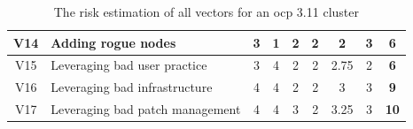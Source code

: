 \begin{landscape}
\begin{table}[]
{\begin{tabular}{|c|l|cccc|cc|c|}
V14             & Adding rogue nodes                                                                     & 3                                        & 1                              & 2                                        & 2                    & 2                                      & 3            & \textbf{6}           \\ \hline
V15             & Leveraging bad user practice                                                           & 3                                        & 4                              & 2                                        & 2                    & 2.75                                   & 2            & \textbf{6}           \\ \hline
V16             & Leveraging bad infrastructure                                                          & 4                                        & 4                              & 2                                        & 2                    & 3                                      & 3            & \textbf{9}           \\ \hline
V17             & Leveraging bad patch management                                                        & 4                                        & 4                              & 3                                        & 2                    & 3.25                                   & 3            & \textbf{10}          \\ \hline
\end{tabular}%
}
\caption{The risk estimation of all vectors for an \gls{ocp} 3.11 cluster\label{ocpRiskTable}}
\end{table}


\end{landscape}
